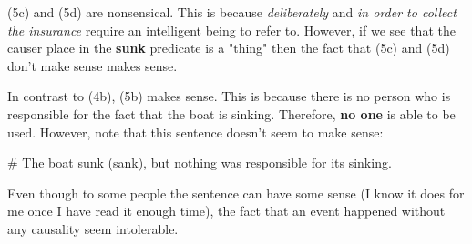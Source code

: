 \documentclass{article}
\begin{document}
(5c) and (5d) are nonsensical. This is because \textit{deliberately} and \textit{in order to collect the insurance} require an intelligent being to refer to. However, if we see that the causer place in the \textbf{sunk} predicate is a "thing" then the fact that (5c) and (5d) don't make sense makes sense. 

In contrast to (4b), (5b) makes sense. This is because there is no person who is responsible for the fact that the boat is sinking. Therefore, \textbf{no one} is able to be used. However, note that this sentence doesn't seem to make sense: 

\# The boat sunk (sank), but nothing was responsible for its sinking. 

Even though to some people the sentence can have some sense (I know it does for me once I have read it enough time), the fact that an event happened without any causality seem intolerable. 
\end{document}
